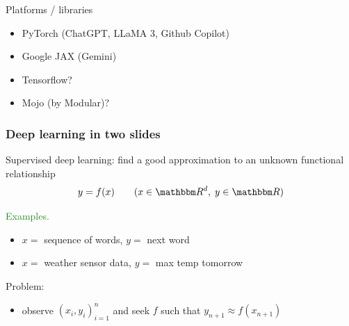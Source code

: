 \documentclass[
    xcolor={svgnames,dvipsnames},
    hyperref={colorlinks, citecolor=DeepPink4, linkcolor=DarkRed, urlcolor=DarkBlue}
    ]{beamer}  %
\newcommand{\Egs}{\textcolor{ForestGreen}{Examples. }}
\newcommand{\1}{\mathbbm 1}
\newcommand{\RR}{\mathbbm R}
\begin{document}
\begin{frame}
    

    Platforms / libraries

    \begin{itemize}
        \item PyTorch (ChatGPT, LLaMA 3, Github Copilot)
        \vspace{0.5em}
        \item Google JAX (Gemini)
        \vspace{0.5em}
        \item Tensorflow? 
        \vspace{0.5em}
        \item Mojo (by Modular)?
    \end{itemize}

\end{frame}


\begin{frame}
    \frametitle{Deep learning in two slides}
    
    Supervised deep learning: find a good approximation to an unknown functional
    relationship
    \begin{equation*}
        y = f(x)
        \qquad (x \in \RR^d, \; y \in \RR)
    \end{equation*}

    \Egs
    \begin{itemize}
        \item $x = $ sequence of words, $y = $ next word
        \vspace{0.5em}
        \item $x = $ weather sensor data, $y = $ max temp tomorrow
    \end{itemize}
        \vspace{0.5em}
        \vspace{0.5em}

    Problem:

    \begin{itemize}
        \item observe $(x_i, y_i)_{i=1}^n$ and seek $f$ such that $y_{n+1}
            \approx f(x_{n+1})$
    \end{itemize}


\end{frame}
\end{document}
